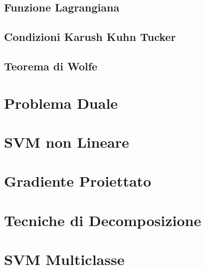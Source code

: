 \documentclass{report}
\begin{document}
\subsection{Funzione Lagrangiana}



\subsection{Condizioni Karush Kuhn Tucker}



\subsection{Teorema di Wolfe}



\section{Problema Duale}



\section{SVM non Lineare}



\section{Gradiente Proiettato}



\section{Tecniche di Decomposizione}



\section{SVM Multiclasse}

 
\end{document}
